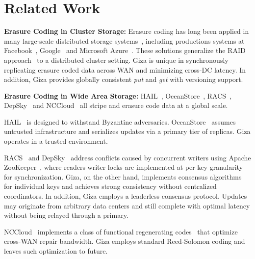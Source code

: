 \section{Related Work}


{\bf Erasure Coding in Cluster Storage:}
Erasure coding has long been applied in many large-scale distributed storage
systems~\cite{fab:asplos04, zhang04repstore, haeberlen05glacier, abd05ursa,
  welch08scalable, sathiamoorthy13xoring, zhang16efficient}, including
productions systems at Facebook~\cite{borthakur2010hdfs},
Google~\cite{fikes2010storage, ford10availability} and Microsoft
Azure~\cite{huang12erasure}. These solutions generalize the RAID
approach~\cite{patterson88case, wilkes96hp} to a distributed cluster setting.
Giza is unique in synchronously replicating erasure coded data across WAN
and minimizing cross-DC latency. In addition,
Giza provides globally consistent {\em put} and {\em get} with versioning support.

{\bf Erasure Coding in Wide Area Storage:}
HAIL~\cite{hail:ccs09}, OceanStore~\cite{oceanstore:asplos00, pond:fast03},
RACS~\cite{racs:socc10}, DepSky~\cite{depsky:eurosys11} 
and NCCloud~\cite{nccloud:fast12} all stripe and erasure code data at a global scale.

HAIL~\cite{hail:ccs09} is designed to withstand Byzantine adversaries.
OceanStore~\cite{oceanstore:asplos00, pond:fast03} assumes untrusted infrastructure
and serializes updates via a primary tier of replicas.
Giza operates in a trusted environment.

RACS~\cite{racs:socc10} and DepSky~\cite{depsky:eurosys11} address conflicts
caused by concurrent writers using Apache ZooKeeper~\cite{zookeeper:atc10},
where readers-writer locks are implemented at per-key granularity for synchronization.
Giza, on the other hand, implements consensus algorithms for individual keys
and achieves strong consistency without centralized coordinators.
In addition, Giza employs a leaderless consensus protocol. 
Updates may originate from arbitrary data centers
and still complete with optimal latency without being relayed through a primary.

NCCloud~\cite{nccloud:fast12} implements a class of functional regenerating
codes~\cite{dimakis07networkcoding} that optimize cross-WAN repair bandwidth.
Giza employs standard Reed-Solomon coding and leaves such optimization to future.

